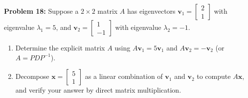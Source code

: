 \documentclass[11pt, letterpaper]{article}
\theoremstyle{definition}
\theoremstyle{remark}
\begin{document}
\vspace{0.4em}
\textbf{Problem 18:}
Suppose a $2 \times 2$ matrix $A$ has eigenvectors $\mathbf{v}_1 = \begin{bmatrix} 2 \\ 1 \end{bmatrix}$ with eigenvalue $\lambda_1 = 5$, and $\mathbf{v}_2 = \begin{bmatrix} 1 \\ -1 \end{bmatrix}$ with eigenvalue $\lambda_2 = -1$.
\begin{enumerate}[label=(\alph*)]
    \item Determine the explicit matrix $A$ using $A\mathbf{v}_1 = 5\mathbf{v}_1$ and $A\mathbf{v}_2 = -\mathbf{v}_2$ (or $A = P D P^{-1}$).
    \item Decompose $\mathbf{x} = \begin{bmatrix} 5 \\ 1 \end{bmatrix}$ as a linear combination of $\mathbf{v}_1$ and $\mathbf{v}_2$ to compute $A\mathbf{x}$, and verify your answer by direct matrix multiplication.
\end{enumerate}
\end{document}
